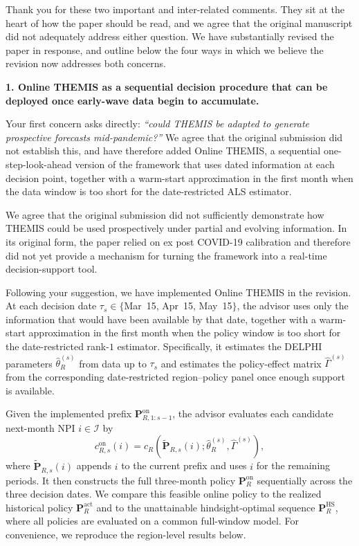 \documentclass[letterpaper,twoside,11pt]{reviewresponse}
\begin{document}
Thank you for these two important and inter-related comments. They sit at the heart of how the paper should be read, and we agree that the original manuscript did not adequately address either question. We have substantially revised the paper in response, and outline below the four ways in which we believe the revision now addresses both concerns.

\textbf{1. Online THEMIS as a sequential decision procedure that can be deployed once early-wave data begin to accumulate.}

Your first concern asks directly: \emph{``could THEMIS be adapted to generate prospective forecasts mid-pandemic?''} We agree that the original submission did not establish this, and have therefore added Online THEMIS, a sequential one-step-look-ahead version of the framework that uses dated information at each decision point, together with a warm-start approximation in the first month when the data window is too short for the date-restricted ALS estimator. 


We agree that the original submission did not sufficiently demonstrate how THEMIS could be used prospectively under partial and evolving information. In its original form, the paper relied on ex post COVID-19 calibration and therefore did not yet provide a mechanism for turning the framework into a real-time decision-support tool.

Following your suggestion, we have implemented Online THEMIS in the revision. At each decision date $\tau_s\in\{$Mar~15, Apr~15, May~15$\}$, the advisor uses only the information that would have been available by that date, together with a warm-start approximation in the first month when the policy window is too short for the date-restricted rank-$1$ estimator. Specifically, it estimates the DELPHI parameters $\hat{\theta}_R^{(s)}$ from data up to $\tau_s$ and estimates the policy-effect matrix $\hat{\Gamma}^{(s)}$ from the corresponding date-restricted region--policy panel once enough support is available.

Given the implemented prefix $\bm{P}_{R,1:s-1}^{\mathrm{on}}$, the advisor evaluates each candidate next-month NPI $i \in \mathcal{I}$ by
\[
c_{R,s}^{\mathrm{on}}(i)
=
c_R\!\left(\widetilde{\bm{P}}_{R,s}(i); \hat{\theta}_R^{(s)}, \hat{\Gamma}^{(s)}\right),
\]
where $\widetilde{\bm{P}}_{R,s}(i)$ appends $i$ to the current prefix and uses $i$ for the remaining periods. It then constructs the full three-month policy $\bm{P}_R^{\mathrm{on}}$ sequentially across the three decision dates. We compare this feasible online policy to the realized historical policy $\bm{P}_R^{\mathrm{act}}$ and to the unattainable hindsight-optimal sequence $\bm{P}_R^{\mathrm{HS}}$, where all policies are evaluated on a common full-window model. For convenience, we reproduce the region-level results below.
\end{document}
